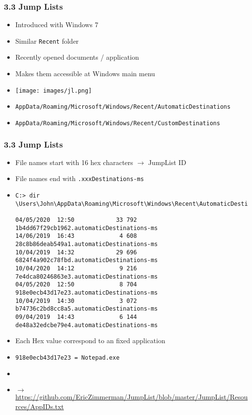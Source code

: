 \begin{frame}[fragile]
  \frametitle{3.3 Jump Lists}
    \begin{itemize}
        \item Introduced with Windows 7
	\item Similar \texttt{Recent} folder
        \item Recently opened documents / application
	\item Makes them accessible at Windows main menu
	\item[]
        \texttt{[image: images/jl.png]}
	\item[] \scriptsize{\texttt{AppData/Roaming/Microsoft/Windows/Recent/AutomaticDestinations}}
	\item[] \scriptsize{\texttt{AppData/Roaming/Microsoft/Windows/Recent/CustomDestinations}}
    \end{itemize}
\end{frame}


\begin{frame}[fragile]
  \frametitle{3.3 Jump Lists}
    \begin{itemize}
        \item File names start with 16 hex characters $\to$ JumpList ID
	\item File names end with \texttt{.xxxDestinations-ms}
	\item[]
  \begin{lstlisting}[basicstyle=\tiny]
C:> dir \Users\John\AppData\Roaming\Microsoft\Windows\Recent\AutomaticDestinations

04/05/2020  12:50            33 792 1b4dd67f29cb1962.automaticDestinations-ms
14/06/2019  16:43             4 608 28c8b86deab549a1.automaticDestinations-ms
10/04/2019  14:32            29 696 6824f4a902c78fbd.automaticDestinations-ms
10/04/2020  14:12             9 216 7e4dca80246863e3.automaticDestinations-ms
04/05/2020  12:50             8 704 918e0ecb43d17e23.automaticDestinations-ms
10/04/2019  14:30             3 072 b74736c2bd8cc8a5.automaticDestinations-ms
09/04/2019  14:43             6 144 de48a32edcbe79e4.automaticDestinations-ms
  \end{lstlisting}
	\item Each Hex value correspond to an fixed application
	\item \texttt{918e0ecb43d17e23 = Notepad.exe}
	\item[]
	\item[] \tiny{$\to$ \url{https://github.com/EricZimmerman/JumpList/blob/master/JumpList/Resources/AppIDs.txt}}
    \end{itemize}
\end{frame}


